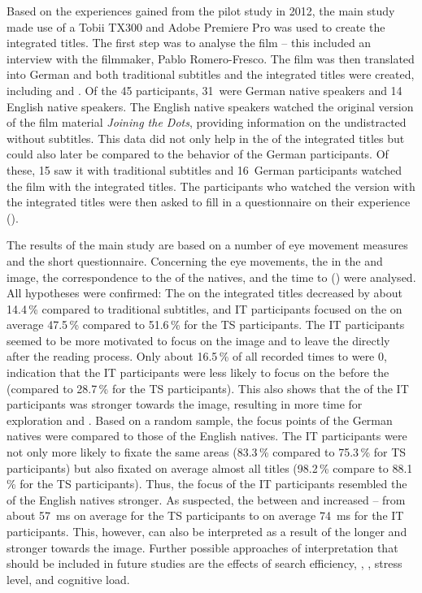 Based on the experiences gained from the pilot study in 2012, the main study made use of a Tobii TX300  and Adobe Premiere Pro was used to create the integrated titles. The first step was to analyse the film – this included an interview with the filmmaker, Pablo Romero-Fresco. The film was then translated into German and both traditional subtitles and the integrated titles were created, including  and . Of the 45 participants, 31~were German native speakers and 14 English native speakers. The English native speakers watched the original version of the film material \textit{Joining the Dots}, providing information on the undistracted  without subtitles. This  data did not only help in the  of the integrated titles but could also later be compared to the  behavior of the German participants. Of these, 15 saw it with traditional subtitles and 16~German participants watched the film with the integrated titles. The participants who watched the version with the integrated titles were then asked to fill in a questionnaire on their experience ().

The results of the main study are based on a number of eye movement measures and the short questionnaire. Concerning the eye movements, the  in the  and image, the correspondence to the  of the natives, and the time to  () were analysed. All hypotheses were confirmed: The  on the integrated titles decreased by about 14.4\,\% compared to traditional subtitles, and IT participants focused on the  on average 47.5\,\% compared to 51.6\,\% for the TS participants. The IT participants seemed to be more motivated to focus on the image and to leave the  directly after the reading process. Only about 16.5\,\% of all recorded times to  were 0, indication that the IT participants were less likely to focus on the  before the  (compared to 28.7\,\% for the TS participants). This also shows that the  of the IT participants was stronger towards the image, resulting in more time for exploration and . Based on a random sample, the focus points of the German natives were compared to those of the English natives. The IT participants were not only more likely to fixate the same areas (83.3\,\% compared to 75.3\,\% for TS participants) but also fixated on average almost all titles (98.2\,\% compare to 88.1\,\% for the TS participants). Thus, the focus of the IT participants resembled the  of the English natives stronger. As suspected, the  between  and  increased – from about 57~ms on average for the TS participants to on average 74~ms for the IT participants. This, however, can also be interpreted as a result of the longer  and stronger  towards the image. Further possible approaches of interpretation that should be included in future studies are the effects of search efficiency, , , stress level, and cognitive load.

